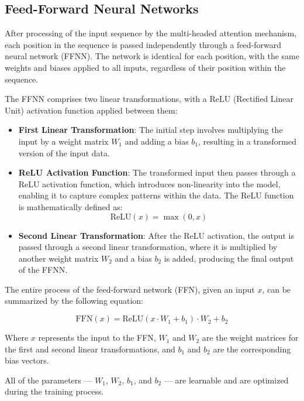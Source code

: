\subsection{Feed-Forward Neural Networks}

After processing of the input sequence by the multi-headed attention mechanism, each position in the sequence is passed independently through a feed-forward neural network (FFNN). The network is identical for each position, with the same weights and biases applied to all inputs, regardless of their position within the sequence.

The FFNN comprises two linear transformations, with a ReLU (Rectified Linear Unit) activation function applied between them:

\begin{itemize}
    \item \textbf{First Linear Transformation}: The initial step involves multiplying the input by a weight matrix \( W_1 \) and adding a bias \( b_1 \), resulting in a transformed version of the input data.
    \item \textbf{ReLU Activation Function}: The transformed input then passes through a ReLU activation function, which introduces non-linearity into the model, enabling it to capture complex patterns within the data. The ReLU function is mathematically defined as:
    \begin{equation}
        \text{ReLU}(x) = \max(0, x)
    \end{equation}
    \item \textbf{Second Linear Transformation}: After the ReLU activation, the output is passed through a second linear transformation, where it is multiplied by another weight matrix \( W_2 \) and a bias \( b_2 \) is added, producing the final output of the FFNN.
\end{itemize}

The entire process of the feed-forward network (FFN), given an input \( x \), can be summarized by the following equation:

\begin{equation}
    \text{FFN}(x) = \text{ReLU}(x \cdot W_1 + b_1) \cdot W_2 + b_2
\end{equation}

Where \( x \) represents the input to the FFN, \( W_1 \) and \( W_2 \) are the weight matrices for the first and second linear transformations, and \( b_1 \) and \( b_2 \) are the corresponding bias vectors.

All of the parameters — \( W_1 \), \( W_2 \), \( b_1 \), and \( b_2 \) — are learnable and are optimized during the training process.

